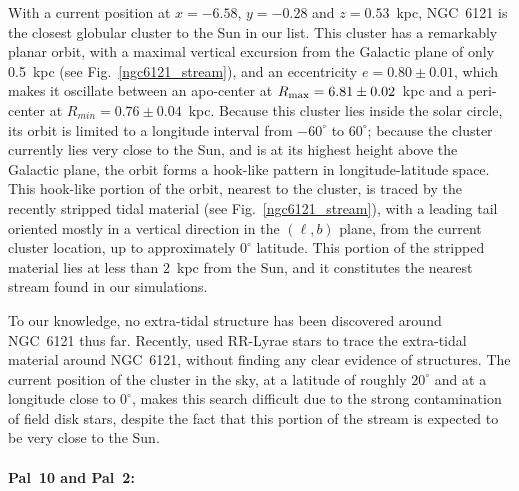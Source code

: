             With a current position at $x=-6.58$, $y=-0.28$ and $z=0.53$~kpc, NGC~6121 is the closest globular cluster to the Sun in our list. This cluster has a  remarkably planar orbit, with a maximal vertical excursion from the Galactic plane of only 0.5~kpc (see  Fig.~\ref{ngc6121_stream}), and an eccentricity $e=0.80 \pm 0.01$, which makes it oscillate between an apo-center at $R_{\rm max}=6.81 \pm 0.02$~kpc and a peri-center at $R_{min}=0.76 \pm 0.04$~kpc. Because this cluster lies inside the solar circle, its orbit is limited to a longitude interval from $-60^{\circ}$ to $60^{\circ}$; because the cluster currently lies very close to the Sun, and is at its highest height above the Galactic plane, the orbit forms a hook-like pattern in longitude-latitude space. This hook-like portion of the orbit, nearest to the cluster, is traced by the recently stripped tidal material (see Fig.~\ref{ngc6121_stream}), with a leading tail oriented mostly in a vertical direction in the $(\ell,b)$ plane, from the current cluster location, up to approximately $0^\circ$ latitude. This portion of the stripped material lies at less than 2~kpc from the Sun, and it constitutes the nearest stream found in our simulations.

            To our knowledge, no extra-tidal structure has been discovered  around NGC~6121 thus far. Recently, \citet{kundu19} used RR-Lyrae stars to trace the extra-tidal material around NGC~6121, without finding any clear evidence of structures. The current position of the cluster in the sky, at a latitude of roughly $20^\circ$ and at a longitude close to $0^\circ$, makes this search  difficult due to the strong contamination of field disk stars, despite the fact that this portion of the stream is expected to be very close to the Sun.

            \paragraph{Pal~10 and Pal~2: }

